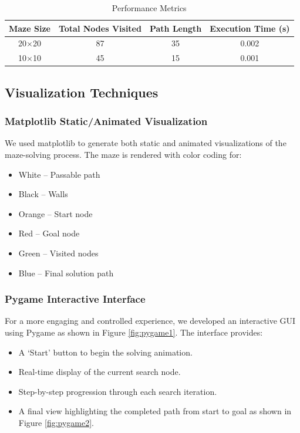 \documentclass[a4paper, journal]{IEEEtran}
\begin{document}
\begin{table}
    \caption{Performance Metrics}
    \centering
    \begin{tabular}{|c|c|c|c|}
        \hline
        \textbf{Maze Size} & \textbf{Total Nodes Visited} & \textbf{Path Length} & \textbf{Execution Time (s)} \\
        \hline
        20$\times$20       & 87                           & 35                   & 0.002                       \\
        10$\times$10       & 45                           & 15                   & 0.001                       \\
        \hline
    \end{tabular}
    \label{tab:results}
\end{table}

\subsection{Visualization Techniques}

\subsubsection{Matplotlib Static/Animated Visualization}
We used matplotlib to generate both static and animated visualizations of the maze-solving process. The maze is rendered with color coding for:
\begin{itemize}
    \item White – Passable path
    \item Black – Walls
    \item Orange – Start node
    \item Red – Goal node
    \item Green – Visited nodes
    \item Blue – Final solution path
\end{itemize}

\subsubsection{Pygame Interactive Interface}
For a more engaging and controlled experience, we developed an interactive GUI using Pygame as shown in Figure \ref{fig:pygame1}. The interface provides:
\begin{itemize}
    \item A ‘Start’ button to begin the solving animation.
    \item Real-time display of the current search node.
    \item Step-by-step progression through each search iteration.
    \item A final view highlighting the completed path from start to goal as shown in Figure \ref{fig:pygame2}.
\end{itemize}
\end{document}
